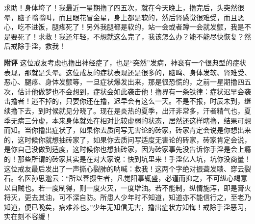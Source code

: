 \begin{case}
    求助！身体垮了！我最近一星期撸了四五次，就在今天晚上，撸完后，头突然很晕，脑子嗡嗡叫，而且眼花冒金星，身上都是软的，然后肾感觉很难受，而且恶心，吃不进饭，腿疼死了！另外我腿都是软的，站一会或者蹲一会就发颤，我是不是要死了！求救！我还年轻，不想就这么完了，我该怎么办？能不能尽快恢复？然后戒除手淫，救我！

    \textbf{附评} 这位戒友考虑也撸出神经症了，也是“突然”发病，神衰有一个很典型的症状表现，那就是头晕。这位戒友的症状表现还是很多的，脑鸣、身体发软、肾难受、恶心、腿疼、身体发颤等，一旦症状爆发出来，那是很恐慌的，之前一星期撸四五次，估计他做梦也不会想到，症状会如此袭击他！撸界有一条铁律：症状迟早会袭击撸者！逃不掉的，只要你还在撸，迟早会有这么一天。不是不报，时辰未到，继续撸下去，到时候就见分晓了。现在是炎热的夏季，出汗非常多，汗者精气也，夏季无病三分虚，本来身体就处在相对比较虚弱的状态，居然还这样瞎撸，结果可想而知。当你撸出症状了，如果你去质问写无害论的砖家，砖家肯定会说是你想出来的，这时候你就想抽砖家了，如果你去质问写适度无害论的砖家，砖家肯定会说，是你自己没做到适度，这时候你也想抽砖家，因为砖家事先没告诉你手淫是会上瘾的！那些所谓的砖家其实是在对大家说：快到坑里来！手淫亿人坑，坑你没商量！这位戒友最后发出了一声撕心裂肺的呐喊：救我！这两个字绝对振聋发聩、穿云裂石。名医孙思邈云：“所以善摄生者，凡觉阳事辄盛，必谨而抑之，不可纵心竭意以自贼也。若一度制得，则一度火灭，一度增油。若不能制，纵情施泻，即是膏火将灭，更去其油，可不深自防。所患人少年时不知道，知道亦不能信行之，至老乃知道，便已晚矣，病难养也。”少年无知信无害，撸出症状方知悔！戒除手淫恶习，实在刻不容缓！
\end{case}

